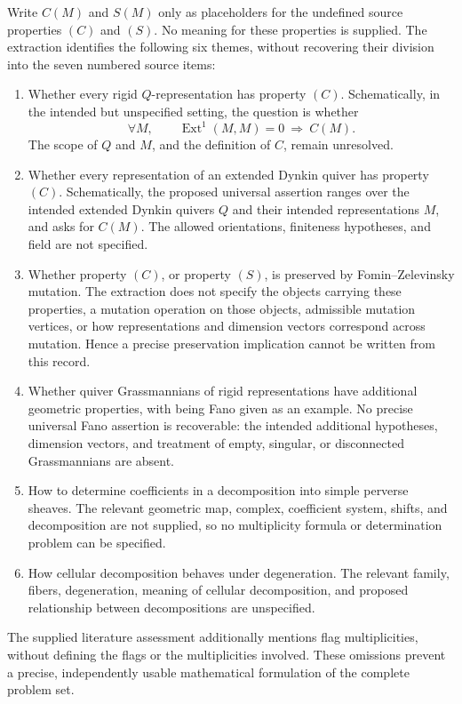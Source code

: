 \documentclass[11pt]{article}
\begin{document}
Write \(C(M)\) and \(S(M)\) only as placeholders for the undefined source properties \((C)\) and \((S)\). No meaning for these properties is supplied. The extraction identifies the following six themes, without recovering their division into the seven numbered source items:
\begin{enumerate}
\item Whether every rigid \(Q\)-representation has property \((C)\). Schematically, in the intended but unspecified setting, the question is whether
\[
\forall M,\qquad \operatorname{Ext}^{1}(M,M)=0\ \Longrightarrow\ C(M).
\]
The scope of \(Q\) and \(M\), and the definition of \(C\), remain unresolved.
\item Whether every representation of an extended Dynkin quiver has property \((C)\). Schematically, the proposed universal assertion ranges over the intended extended Dynkin quivers \(Q\) and their intended representations \(M\), and asks for \(C(M)\). The allowed orientations, finiteness hypotheses, and field are not specified.
\item Whether property \((C)\), or property \((S)\), is preserved by Fomin--Zelevinsky mutation. The extraction does not specify the objects carrying these properties, a mutation operation on those objects, admissible mutation vertices, or how representations and dimension vectors correspond across mutation. Hence a precise preservation implication cannot be written from this record.
\item Whether quiver Grassmannians of rigid representations have additional geometric properties, with being Fano given as an example. No precise universal Fano assertion is recoverable: the intended additional hypotheses, dimension vectors, and treatment of empty, singular, or disconnected Grassmannians are absent.
\item How to determine coefficients in a decomposition into simple perverse sheaves. The relevant geometric map, complex, coefficient system, shifts, and decomposition are not supplied, so no multiplicity formula or determination problem can be specified.
\item How cellular decomposition behaves under degeneration. The relevant family, fibers, degeneration, meaning of cellular decomposition, and proposed relationship between decompositions are unspecified.
\end{enumerate}
The supplied literature assessment additionally mentions flag multiplicities, without defining the flags or the multiplicities involved. These omissions prevent a precise, independently usable mathematical formulation of the complete problem set.
\end{document}
